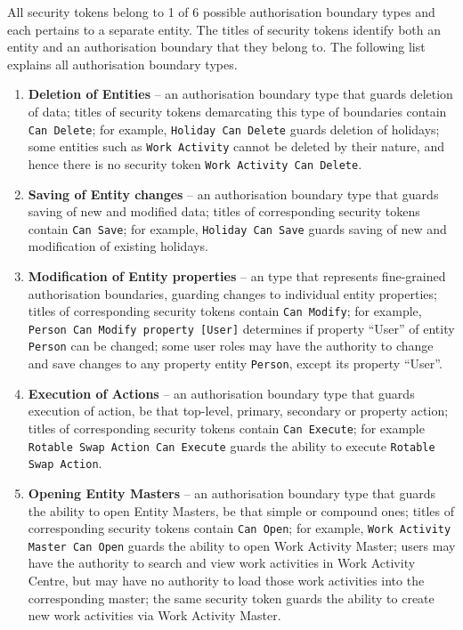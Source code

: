 \documentclass[a4paper,12pt,oneside,openright]{memoir}
\begin{document}
	All security tokens belong to 1 of 6 possible authorisation boundary types and each pertains to a separate entity.
	The titles of security tokens identify both an entity and an authorisation boundary that they belong to.
	The following list explains all authorisation boundary types.

	\begin{enumerate}
		\item\textbf{Deletion of Entities} -- an authorisation boundary type that guards deletion of data; titles of security tokens demarcating this type of boundaries contain \texttt{Can Delete}; for example, \texttt{Holiday Can Delete} guards deletion of holidays; some entities such as \texttt{Work Activity} cannot be deleted by their nature, and hence there is no security token \texttt{Work Activity Can Delete}.

		\item\textbf{Saving of Entity changes} -- an authorisation boundary type that guards saving of new and modified data; titles of corresponding security tokens contain \texttt{Can Save}; for example, \texttt{Holiday Can Save} guards saving of new and modification of existing holidays.

		\item\textbf{Modification of Entity properties} -- an type that represents fine-grained authorisation boundaries, guarding changes to individual entity properties; titles of corresponding security tokens contain \texttt{Can Modify}; for example, \texttt{Person Can Modify property [User]} determines if property ``User'' of entity \texttt{Person} can be changed; some user roles may have the authority to change and save changes to any property entity \texttt{Person}, except its property ``User''.

		\item\textbf{Execution of Actions} -- an authorisation boundary type that guards execution of action, be that top-level, primary, secondary or property action; titles of corresponding security tokens contain \texttt{Can Execute}; for example \texttt{Rotable Swap Action Can Execute} guards the ability to execute \texttt{Rotable Swap Action}.

		\item\textbf{Opening Entity Masters} -- an authorisation boundary type that guards the ability to open Entity Masters, be that simple or compound ones; titles of corresponding security tokens contain \texttt{Can Open}; for example, \texttt{Work Activity Master Can Open} guards the ability to open Work Activity Master; users may have the authority to search and view work activities in Work Activity Centre, but may have no authority to load those work activities into the corresponding master; the same security token guards the ability to create new work activities via Work Activity Master.


\end{enumerate}
\end{document}
